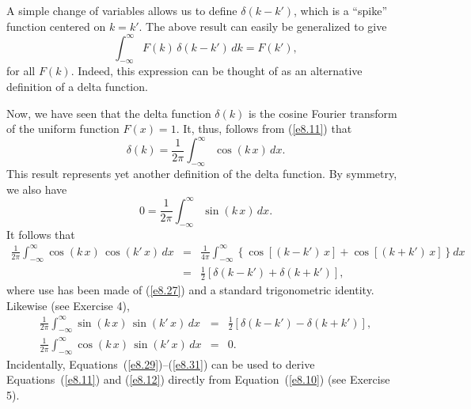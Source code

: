 A simple change of variables allows us to define $\delta(k-k')$, which is a
``spike'' function centered on $k=k'$. The above result can easily be generalized
to give
\begin{equation}\label{e8.26}
\int_{-\infty}^{\infty} F(k)\,\delta(k-k')\,dk = F(k'),
\end{equation}
for all $F(k)$. 
Indeed, this expression can be thought of as an alternative definition of a
delta function. 

Now, we have seen that the delta function $\delta(k)$ is the cosine Fourier transform of
the uniform function $F(x)=1$. It, thus, follows from (\ref{e8.11}) that
\begin{equation}\label{e8.27}
\delta (k) = \frac{1}{2\pi}\int_{-\infty}^{\infty} \cos(k\,x)\,dx.
\end{equation}
This result represents yet another definition of the delta function. By symmetry,
 we also have
\begin{equation}\label{e8.28}
0 = \frac{1}{2\pi}\int_{-\infty}^{\infty} \sin(k\,x)\,dx.
\end{equation}
It follows that
\begin{eqnarray}
\frac{1}{2\pi}\int_{-\infty}^\infty \cos(k\,x)\,\cos(k'\,x)\,dx
&=& \frac{1}{4\pi} \int_{-\infty}^\infty\left\{\cos\left[(k-k')\,x\right]+\cos\left[(k+k')\,x\right]\right\}dx\nonumber\\[0.5ex]
&=& \frac{1}{2}\left[\delta(k-k') + \delta(k+k')\right],\label{e8.29}
\end{eqnarray}
where use has been made of (\ref{e8.27}) and a standard trigonometric identity. Likewise (see Exercise 4),
\begin{eqnarray}\label{e8.30}
\frac{1}{2\pi}\int_{-\infty}^\infty \sin(k\,x)\,\sin(k'\,x)\,dx
&=& \frac{1}{2}\left[\delta(k-k') - \delta(k+k')\right],\\[0.5ex]
\frac{1}{2\pi}\int_{-\infty}^\infty \cos(k\,x)\,\sin(k'\,x)\,dx &=&0.\label{e8.31}
\end{eqnarray}
Incidentally, Equations~(\ref{e8.29})--(\ref{e8.31}) can be used to derive Equations~(\ref{e8.11}) and (\ref{e8.12}) directly from Equation~(\ref{e8.10}) (see Exercise 5).

